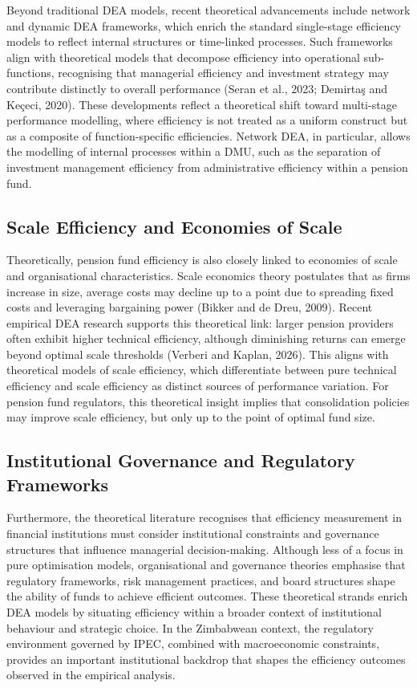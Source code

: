 \documentclass[12pt,a4paper]{article}
\begin{document}
Beyond traditional DEA models, recent theoretical advancements include network and dynamic DEA frameworks, which enrich the standard single-stage efficiency models to reflect internal structures or time-linked processes. Such frameworks align with theoretical models that decompose efficiency into operational sub-functions, recognising that managerial efficiency and investment strategy may contribute distinctly to overall performance (Seran et al., 2023; Demirta\c{s} and Ke\c{c}eci, 2020). These developments reflect a theoretical shift toward multi-stage performance modelling, where efficiency is not treated as a uniform construct but as a composite of function-specific efficiencies. Network DEA, in particular, allows the modelling of internal processes within a DMU, such as the separation of investment management efficiency from administrative efficiency within a pension fund.

\subsection{Scale Efficiency and Economies of Scale}

Theoretically, pension fund efficiency is also closely linked to economies of scale and organisational characteristics. Scale economics theory postulates that as firms increase in size, average costs may decline up to a point due to spreading fixed costs and leveraging bargaining power (Bikker and de Dreu, 2009). Recent empirical DEA research supports this theoretical link: larger pension providers often exhibit higher technical efficiency, although diminishing returns can emerge beyond optimal scale thresholds (Verberi and Kaplan, 2026). This aligns with theoretical models of scale efficiency, which differentiate between pure technical efficiency and scale efficiency as distinct sources of performance variation. For pension fund regulators, this theoretical insight implies that consolidation policies may improve scale efficiency, but only up to the point of optimal fund size.

\subsection{Institutional Governance and Regulatory Frameworks}

Furthermore, the theoretical literature recognises that efficiency measurement in financial institutions must consider institutional constraints and governance structures that influence managerial decision-making. Although less of a focus in pure optimisation models, organisational and governance theories emphasise that regulatory frameworks, risk management practices, and board structures shape the ability of funds to achieve efficient outcomes. These theoretical strands enrich DEA models by situating efficiency within a broader context of institutional behaviour and strategic choice. In the Zimbabwean context, the regulatory environment governed by IPEC, combined with macroeconomic constraints, provides an important institutional backdrop that shapes the efficiency outcomes observed in the empirical analysis.
\end{document}
